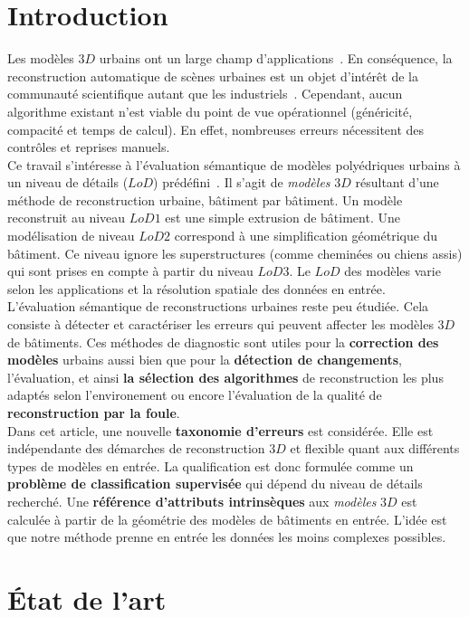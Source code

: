 \documentclass[a4paper,french]{article}
\begin{document}
    \section{Introduction}
    Les modèles $3D$ urbains ont un large champ d'applications~\cite{Biljecki2015}. En conséquence, la reconstruction automatique de scènes urbaines est un objet d'intérêt de la communauté scientifique autant que les industriels~\cite{Musialski2012}. Cependant, aucun algorithme existant n'est viable du point de vue opérationnel {\color{red}(généricité, compacité et temps de calcul)}. En effet, nombreuses erreurs nécessitent des contrôles et reprises manuels.\\
    Ce travail s'intéresse à l'évaluation sémantique de modèles polyédriques urbains à un niveau de détails ($LoD$) prédéfini~\cite{kolbe2005citygml}. Il s'agit de \textit{modèles} $3D$ résultant d'une méthode de reconstruction urbaine, bâtiment par bâtiment. Un modèle reconstruit au niveau $LoD 1$ est une simple extrusion de bâtiment. Une modélisation de niveau $LoD 2$ correspond à une simplification géométrique du bâtiment. Ce niveau ignore les superstructures (comme cheminées ou chiens assis) qui sont prises en compte à partir du niveau $LoD 3$. Le $LoD$ des modèles varie selon les applications et la résolution spatiale des données en entrée.\\
    L'évaluation sémantique de reconstructions urbaines reste peu étudiée. Cela consiste à détecter et caractériser les erreurs qui peuvent affecter les modèles $3D$ de bâtiments. Ces méthodes de diagnostic {\color{red}sont utiles} pour la \textbf{correction des modèles} urbains aussi bien que pour la \textbf{détection de changements}, l'évaluation, et ainsi \textbf{la sélection des algorithmes} de reconstruction les plus adaptés selon l'environement ou encore l'évaluation de la qualité de \textbf{reconstruction par la foule}.\\
    Dans cet article, une nouvelle \textbf{taxonomie d'erreurs} est considérée. Elle est indépendante des démarches de reconstruction $3D$ et flexible quant aux différents types de modèles en entrée. La qualification est donc formulée comme un \textbf{problème de classification supervisée} qui dépend du niveau de détails recherché. Une \textbf{référence d'attributs intrinsèques} {\color{red}aux \textit{modèles} $3D$} est calculée à partir de la géométrie des modèles de bâtiments en entrée. L'idée est que notre méthode prenne en entrée les données les moins complexes possibles.

    \section{\'Etat de l'art}
\end{document}
